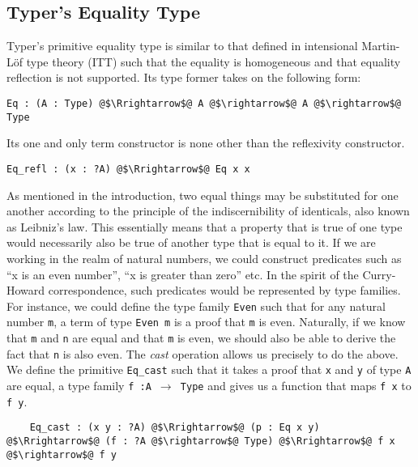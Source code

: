 \documentclass[12pt,twoside,maitrise]{dms}
\theoremstyle{definition}
\numberwithin{equation}{section}
\numberwithin{table}{chapter}
\numberwithin{figure}{chapter}
\newcommand\id[1] {\texttt{#1}}
\newcommand\fn[1] {\texttt{#1}}
\begin{document}
\subsection{Typer's Equality Type}\label{sec:typer-old-eq}

Typer's primitive equality type is similar to that defined in intensional
Martin-Löf type theory\cite{martin1975intuitionistic} (ITT) such that the
equality is homogeneous and that equality reflection is not supported. Its type
former takes on the following form:

\begin{verbatim}
Eq : (A : Type) @$\Rrightarrow$@ A @$\rightarrow$@ A @$\rightarrow$@ Type
\end{verbatim}

Its one and only term constructor is none other than the reflexivity constructor.

\begin{verbatim}
Eq_refl : (x : ?A) @$\Rrightarrow$@ Eq x x
\end{verbatim}

As mentioned in the introduction, two equal things may be substituted for one
another according to the principle of the indiscernibility of identicals, also
known as Leibniz's law. This essentially means that a property that is true of
one type would necessarily also be true of another type that is equal to it. If
we are working in the realm of natural numbers, we could construct predicates
such as ``x is an even number'', ``x is greater than zero'' etc. In the spirit
of the Curry-Howard correspondence, such predicates would be represented by type
families. For instance, we could define the type family \id{Even} such that for
any natural number \id{m}, a term of type \fn{Even m} is a proof that \id{m} is
even. Naturally, if we know that \id{m} and \id{n} are equal and that \id{m} is
even, we should also be able to derive the fact that \id{n} is also even. The
\emph{cast} operation allows us precisely to do the above. We define the
primitive \id{Eq\_cast} such that it takes a proof that \id{x} and \id{y} of
type \id{A} are equal, a type family \fn{f :\@ A $\rightarrow$ Type} and
gives us a function that maps \fn{f x} to \fn{f y}.

\begin{verbatim}
    Eq_cast : (x y : ?A) @$\Rrightarrow$@ (p : Eq x y) @$\Rrightarrow$@ (f : ?A @$\rightarrow$@ Type) @$\Rrightarrow$@ f x @$\rightarrow$@ f y
\end{verbatim}
\end{document}
